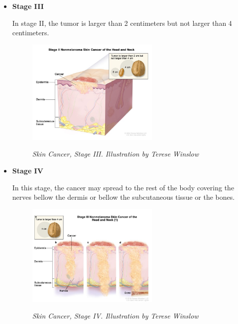 \begin{itemize}
  \item \textbf{Stage III}

    In stage II, the tumor is larger than 2 centimeters but not larger than 4
    centimeters.

    \begin{figure}[H] \centering
      \includegraphics[width=0.6\textwidth]{imatges/problem_domain/stage2-skin-cancer.jpg}
      \caption[Skin Cancer, Stage III]{\textit{Skin Cancer, Stage III.
      Illustration by Terese Winslow}} {\label{fig:stage2-skin-canceer}}
    \end{figure}

    \newpage

  \item \textbf{Stage IV}

    In this stage, the cancer may spread to the rest of the body covering the
    nerves bellow the dermis or bellow the subcutaneous tissue or the bones.

    \begin{figure}[H] \centering
      \includegraphics[width=0.6\textwidth]{imatges/problem_domain/stage3-skin-cancer.jpg}
      \caption[Skin Cancer, Stage IV]{\textit{Skin Cancer, Stage IV. Illustration by
    Terese Winslow}} {\label{fig:stage3-skin-canceer}} \end{figure}

\end{itemize}

